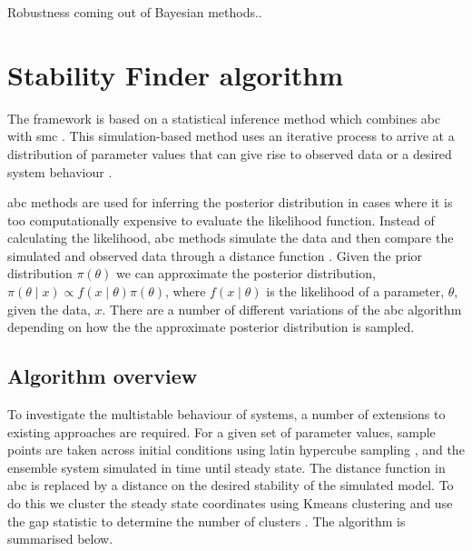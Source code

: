{Robustness coming out of Bayesian methods..



\section{Stability Finder algorithm}

The framework is based on a statistical inference method which combines \acrfull{abc} with \acrfull{smc} \autocite{Toni:2009tr}. This simulation-based method uses an iterative process to arrive at a distribution of parameter values that can give rise to observed data or a desired system behaviour \autocite{Barnes:2011hh}.

\acrshort{abc} methods are used for inferring the posterior distribution in cases where it is too computationally expensive to evaluate the likelihood function. Instead of calculating the likelihood, \acrshort{abc} methods simulate the data and then compare the simulated and observed data through a distance function \autocite{Toni:2009tr}. Given the prior distribution $\pi(\theta)$ we can approximate the posterior distribution, $\pi(\theta\mid x)\propto f(x\mid\theta)\pi(\theta)$, where $f(x\mid\theta)$ is the likelihood of a parameter, $\theta$, given the data, $x$. There are a number of different variations of the \acrshort{abc} algorithm depending on how the the approximate posterior distribution is sampled. 

\subsection{Algorithm overview}

To investigate the multistable behaviour of systems, a number of extensions to existing approaches are required. For a given set of parameter values, sample points are taken across initial conditions using latin hypercube sampling \autocite{XXX}, and the ensemble system simulated in time until steady state. The distance function in \acrshort{abc} is replaced by a distance on the desired stability of the simulated model. To do this we cluster the steady state coordinates using Kmeans clustering and use the gap statistic to determine the number of clusters \autocite{XXX}. The algorithm is summarised below.

}
